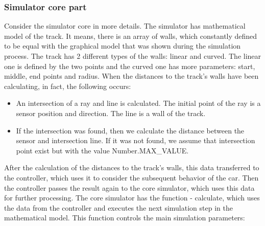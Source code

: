 \subsubsection{Simulator core part}
Consider the simulator core in more details. The simulator has mathematical model of the track. It means, there is an array of walls, which constantly defined to be equal with the graphical model that was shown during the simulation process. The track has 2 different types of the walls: linear and curved. The linear one is defined by the two points and the curved one has more parameters: start, middle, end points and radius. When the distances to the track's walls have been calculating, in fact, the following occurs:
\begin{itemize}
    \item An intersection of a ray and line is calculated. The initial point of the ray is a sensor position and direction. The line is a wall of the track.
    \item If the intersection was found, then we calculate the distance between the sensor and intersection line. If it was not found, we assume that intersection point exist but with the value Number.MAX\_VALUE.
\end{itemize}
After the calculation of the distances to the track's walls, this data transferred to the controller, which uses it to consider the subsequent behavior of the car. Then the controller passes the result again to the core simulator, which uses this data for further processing. The core simulator has the function - calculate, which uses the data from the controller and executes the next simulation step in the mathematical model. This function controls the main simulation parameters:
